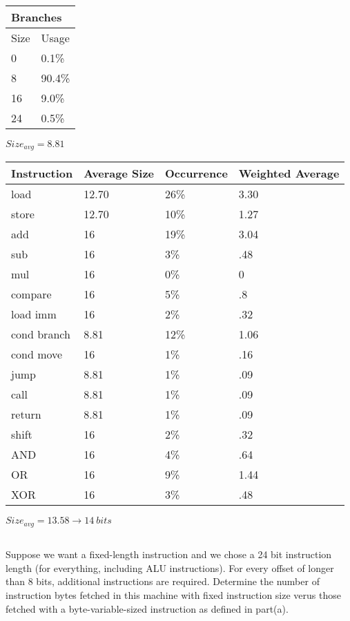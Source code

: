 \documentclass{article}
\begin{document}
\begin{multicols}{3}
\begin{minipage}{\linewidth}
\begin{tabular}{|l|l|}
\hline
\multicolumn{2}{|l|}{Branches}\\
\hline
Size & Usage \\
\hline
0 & 0.1\%\\
8 & 90.4\%\\
16 & 9.0\%\\
24 & 0.5\%\\
\hline
\end{tabular}\par
\bigskip
$Size_{avg}=8.81$\\
\end{minipage}
\vfill
\columnbreak
\begin{minipage}{\linewidth}
\begin{tabular}{|l|l|l|l|}
\hline
Instruction & Average Size & Occurrence & Weighted Average \\
\hline
load & 12.70 & 26\% &  3.30\\
store & 12.70 & 10\% & 1.27  \\
add & 16 & 19\% & 3.04\\
sub & 16 & 3\% & .48\\
mul & 16 & 0\% & 0 \\
compare & 16 & 5\% & .8\\
load imm & 16 & 2\% & .32\\
cond branch & 8.81 & 12\% & 1.06\\
cond move & 16 & 1\% & .16\\
jump & 8.81 & 1\% & .09\\ 
call & 8.81 & 1\% & .09\\
return & 8.81 & 1\% & .09\\
shift & 16 & 2\% & .32 \\
AND & 16 & 4\% & .64 \\
OR & 16 & 9\% & 1.44\\
XOR & 16 & 3\% & .48\\
\hline
\end{tabular}\par
\bigskip
$Size_{avg}=13.58\rightarrow14\ bits$
\end{minipage}
\end{multicols}
\subsection{}
Suppose we want a fixed-length instruction and we chose a 24 bit instruction length (for everything, including ALU instructions). For every offset of longer than 8 bits, additional instructions are required. Determine the number of instruction bytes fetched in this machine with fixed instruction size verus those fetched with a byte-variable-sized instruction as defined in part(a).\\
\vspace{5mm}
\end{document}
